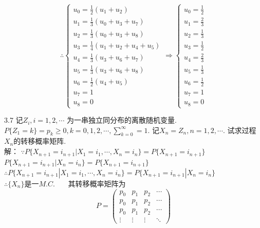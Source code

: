 \[
\therefore
\begin{cases}
u_0 = \frac{1}{2}(u_1+u_2)\\
u_1 = \frac{1}{3}(u_0+u_3+u_7)\\
u_2 = \frac{1}{3}(u_0+u_3+u_8)\\
u_3 = \frac{1}{4}(u_1+u_2+u_4+u_5)\\
u_4 = \frac{1}{3}(u_3+u_6+u_7)\\
u_5 = \frac{1}{3}(u_3+u_6+u_8)\\
u_6 = \frac{1}{2}(u_4+u_5)\\
u_7 = 1\\
u_8 = 0
\end{cases}
\Rightarrow
\begin{cases}
u_0 = \frac{1}{2}\\
u_1 = \frac{2}{3}\\
u_2 = \frac{1}{3}\\
u_3 = \frac{1}{2}\\
u_4 = \frac{2}{3}\\
u_5 = \frac{1}{3}\\
u_6 = \frac{1}{2}\\
u_7 = 1\\
u_8 = 0
\end{cases}
\]


3.7 记$Z_i, i = 1, 2, \cdots$ 为一串独立同分布的离散随机变量. $P\{Z_1 = k\} = p_k \geqslant 0, k = 0,1,2,\cdots, \sum\limits^\infty_{k=0} = 1$. 记$X_n = Z_n, n = 1, 2, \cdots$. 试求过程$X_n$的转移概率矩阵.\\
解：
$\because P\{X_{n+1} = i_{n+1} | X_1 = i_1, \cdots , X_n = i_n\} = P\{X_{n+1} = i_{n+1}\}$\\
$P\{X_{n+1} = i_{n+1} | X_n = i_n\} = P\{X_{n+1} = i_{n+1}\}$\\
$\therefore P\{X_{n+1} = i_{n+1} | X_1 = i_1, \cdots , X_n = i_n\} = P\{X_{n+1} = i_{n+1} | X_n = i_n\}$\\
$\therefore \{X_n\}$是一$M.C.$ ~~~其转移概率矩阵为
\[
P = 
\begin{pmatrix}
p_0 & p_1 & p_2 & \cdots \\
p_0 & p_1 & p_2 & \cdots \\
p_0 & p_1 & p_2 & \cdots \\
\vdots & \vdots & \vdots & \ddots
\end{pmatrix}
\]


